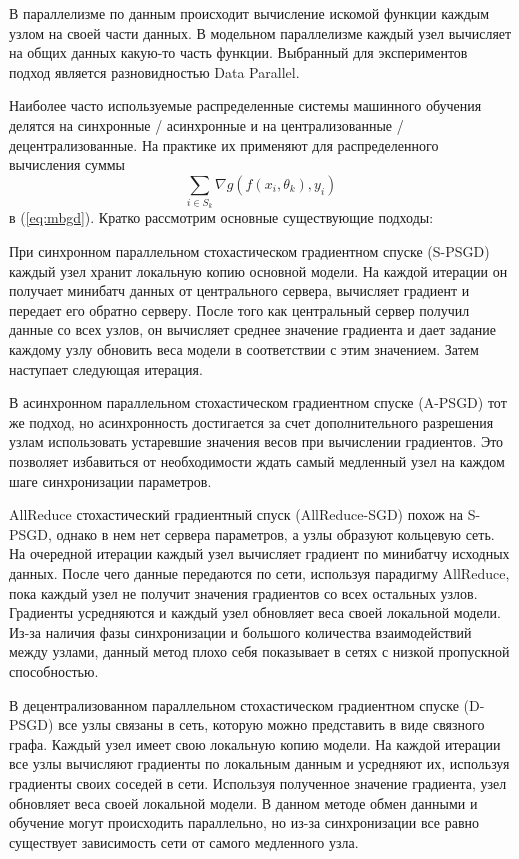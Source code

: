 \documentclass[a4paper,article,14pt]{extarticle}
\begin{document}
В параллелизме по данным происходит вычисление искомой функции каждым узлом на своей части данных. В модельном параллелизме каждый узел вычисляет на общих данных какую-то часть функции. Выбранный для экспериментов подход является разновидностью Data Parallel.

Наиболее часто используемые распределенные системы машинного обучения делятся на синхронные / асинхронные и на централизованные / децентрализованные. На практике их применяют для распределенного вычисления суммы
\begin{equation}
\sum_{i\in S_k}\nabla g(f(x_i, \theta_k), y_i)
\end{equation}
в (\ref{eq:mbgd}). Кратко рассмотрим основные существующие подходы:

При синхронном параллельном стохастическом градиентном спуске (S-PSGD) \cite{o1} каждый узел хранит локальную копию основной модели. На каждой итерации он получает минибатч данных от центрального сервера, вычисляет градиент и передает его обратно серверу. После того как центральный сервер получил данные со всех узлов, он вычисляет среднее значение градиента и дает задание каждому узлу обновить веса модели в соответствии с этим значением. Затем наступает следующая итерация.

В асинхронном параллельном стохастическом градиентном спуске (A-PSGD) \cite{o2, o3, o4, o5} тот же подход, но асинхронность достигается за счет дополнительного разрешения узлам использовать устаревшие значения весов при вычислении градиентов. Это позволяет избавиться от необходимости ждать самый медленный узел на каждом шаге синхронизации параметров.

AllReduce стохастический градиентный спуск (AllReduce-SGD) \cite{o6, o7} похож на  S-PSGD,  однако в нем нет сервера параметров, а узлы образуют кольцевую сеть. На очередной итерации каждый узел вычисляет градиент по минибатчу исходных данных. После чего данные передаются по сети, используя парадигму AllReduce, пока каждый узел не получит значения градиентов со всех остальных узлов. Градиенты усредняются и каждый узел обновляет веса своей локальной модели. Из-за наличия фазы синхронизации и большого количества взаимодействий между узлами, данный метод плохо себя показывает в сетях с низкой пропускной способностью.

В децентрализованном параллельном стохастическом градиентном спуске (D-PSGD) \cite{o8, o9, o10} все узлы связаны в сеть, которую можно представить в виде связного графа. Каждый узел имеет свою локальную копию модели. На каждой итерации все узлы вычисляют градиенты по локальным данным и усредняют их, используя градиенты своих соседей в сети. Используя полученное значение градиента, узел обновляет веса своей локальной модели. В данном методе обмен данными и обучение могут происходить параллельно, но из-за синхронизации все равно существует зависимость сети от самого медленного узла.
\end{document}
